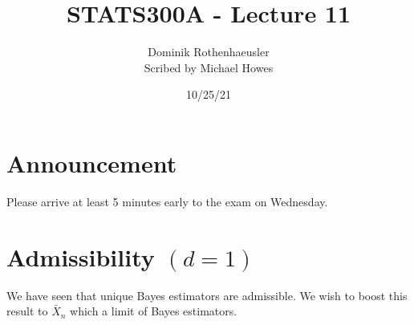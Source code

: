 




\title{STATS300A - Lecture 11}
\author{Dominik Rothenhaeusler\\ Scribed by Michael Howes}
\date{10/25/21}

\pagestyle{fancy}
\fancyhf{}


\maketitle
\tableofcontents

\section{Announcement}
Please arrive at least 5 minutes early to the exam on Wednesday.

\section{Admissibility $(d=1)$}
We have seen that unique Bayes estimators are admissible. We wish to boost this result to $\bar{X}_n$ which a limit of Bayes estimators.

